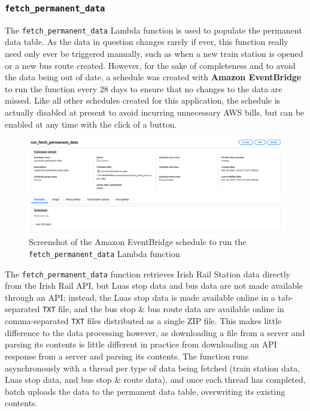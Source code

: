 \documentclass[a4paper,11pt]{report}
\begin{document}
\subsubsection{\texttt{fetch_permanent_data}}
The \verb|fetch_permanent_data| Lambda function is used to populate the permanent data table.
As the data in question changes rarely if ever, this function really need only ever be triggered manually, such as when a new train station is opened or a new bus route created.
However, for the sake of completeness and to avoid the data being out of date, a schedule was created with \textbf{Amazon EventBridge} to run the function every 28 days to ensure that no changes to the data are missed.
Like all other schedules created for this application, the schedule is actually disabled at present to avoid incurring unnecessary AWS bills, but can be enabled at any time with the click of a button.

\begin{figure}[H]
    \centering
    \includegraphics[width=\textwidth]{./images/fetch_permanent_data_schedule.png}
    \caption{Screenshot of the Amazon EventBridge schedule to run the \texttt{fetch_permanent_data} Lambda function}
\end{figure}

The \verb|fetch_permanent_data| function retrieves Irish Rail Station data directly from the Irish Rail API, but Luas stop data and bus data are not made available through an API;
instead, the Luas stop data is made available online in a tab-separated \verb|TXT| file, and the bus stop \& bus route data are available online in comma-separated \verb|TXT| files distributed as a single ZIP file.
This makes little difference to the data processing however, as downloading a file from a server and parsing its contents is little different in practice from downloading an API response from a server and parsing its contents.
The function runs asynchronously with a thread per type of data being fetched (train station data, Luas stop data, and bus stop \& route data), and once each thread has completed, batch uploads the data to the permanent data table, overwriting its existing contents.
\end{document}
